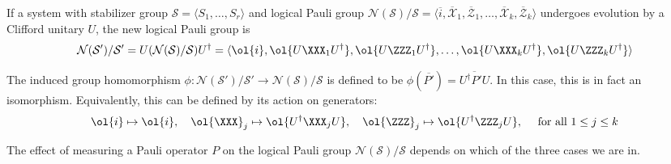 \begin{theorem}\label{thm:logical_pauli_group_update_clifford}
    If a system with stabilizer group $\mathcal{S} = \langle S_1, \ldots, S_r \rangle$ and logical Pauli group $\mathcal{N}(\mathcal{S})/\mathcal{S} = \langle \overline{i}, \overline{\mathcal{X}}_1, \overline{\mathcal{Z}}_1, \ldots, \overline{\mathcal{X}}_k, \overline{\mathcal{Z}}_k \rangle$ undergoes evolution by a Clifford unitary $U$, the new logical Pauli group is
    \begin{equation}\label{eq:new_logical_Pauli_group}
        \mathcal{N}(\mathcal{S}')/\mathcal{S}' = U (\mathcal{N}(\mathcal{S})/\mathcal{S}) U^\dagger = \langle \ol{i}, \ol{U \XXX_1 U^\dagger}, \ol{U \ZZZ_1 U^\dagger}, \ldots, \ol{U \XXX_k U^\dagger},  \ol{U \ZZZ_k U^\dagger} \rangle
    \end{equation}

    The induced group homomorphism $\phi : \mathcal{N}(\mathcal{S}')/\mathcal{S}' \to \mathcal{N}(\mathcal{S})/\mathcal{S}$ is defined to be $\phi(\overline{P'}) = \overline{U^\dagger P' U}$.
    In this case, this is in fact an isomorphism.
    Equivalently, this can be defined by its action on generators:
    \begin{equation}
        \ol{i} \mapsto \ol{i}, \quad
        \ol{\XXX}_j \mapsto \ol{U^\dagger \XXX_j U}, \quad
        \ol{\ZZZ}_j \mapsto \ol{U^\dagger \ZZZ_j U}, \quad
        \text { for all $1 \leq j \leq k$}
    \end{equation}
\end{theorem}

The effect of measuring a Pauli operator $P$ on the logical Pauli group $\mathcal{N}(\mathcal{S})/\mathcal{S}$ depends on which of the three cases we are in.

